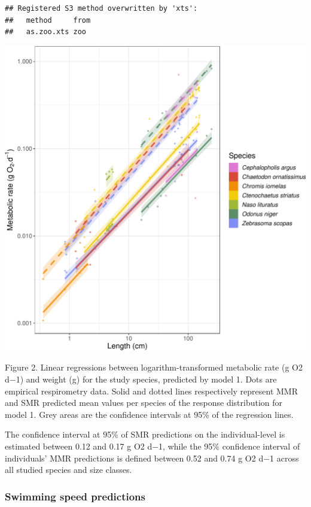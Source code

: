 \documentclass[12pt,a4paper]{article}
\makeatletter
\def\maxwidth{\ifdim\Gin@nat@width>\linewidth\linewidth
\else\Gin@nat@width\fi}
\let\Oldincludegraphics\includegraphics
\renewcommand{\includegraphics}[1]{\Oldincludegraphics[width=\maxwidth]{#1}}
\let\origfigure\figure
\let\endorigfigure\endfigure
\renewenvironment{figure}[1][2] {
    \expandafter\origfigure\expandafter[H]
} {
    \endorigfigure
}
\makeatother
\begin{document}
\begin{verbatim}
## Registered S3 method overwritten by 'xts':
##   method     from
##   as.zoo.xts zoo
\end{verbatim}

\begin{figure}
\centering
\includegraphics{main_text_files/figure-latex/unnamed-chunk-2-1.pdf}
\caption{testttt}
\end{figure}

Figure 2. Linear regressions between logarithm-transformed metabolic
rate (g O2 d−1) and weight (g) for the study species, predicted by model
1. Dots are empirical respirometry data. Solid and dotted lines
respectively represent MMR and SMR predicted mean values per species of
the response distribution for model 1. Grey areas are the confidence
intervals at 95\% of the regression lines.

\noindent The confidence interval at 95\% of SMR predictions on the
individual-level is estimated between 0.12 and 0.17 g O2 d−1, while the
95\% confidence interval of individuals' MMR predictions is defined
between 0.52 and 0.74 g O2 d−1 across all studied species and size
classes.

\hypertarget{swimming-speed-predictions}{%
\subsubsection{Swimming speed
predictions}\label{swimming-speed-predictions}}
\end{document}
